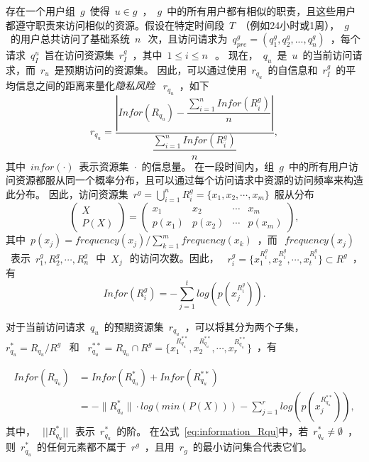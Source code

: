 存在一个用户组~$g$~使得~$u \in g$~，~$g$~中的所有用户都有相似的职责，且这些用户都遵守职责来访问相似的资源。假设在特定时间段~$T$~（例如24小时或1周），~$g$~的用户总共访问了基础系统~$n~$~次，且访问请求为~$q^g_{pre}=(q^g_1,q^g_2,...,q^g_n)$~，每个请求~$q^u_I$~旨在访问资源集~$r^g_I$~，其中~$1 \leq i \leq n~$~。
现在，~$q_u$~是~$u$~的当前访问请求，而~$r_u$~是预期访问的资源集。 因此，可以通过使用~$r_{q_u}$~的自信息和~$r^g_I$~的平均信息之间的距离来量化\emph{隐私风险} ~$r_{q_u}$~，如下
\begin{equation}\label{eq:privacy_risk_qu}
r_{q_u} = \dfrac{|Infor(R_{q_u})-\dfrac{\sum ^{n}_{i=1} Infor(R^g_i)}{n}|}{\dfrac{\sum ^{n}_{i=1} Infor(R^g_i)}{n}}, 
\end{equation}
其中~$infor(\cdot)$~表示资源集~$\cdot$~的信息量。 在一段时间内，组~$g$~中的所有用户访问资源都服从同一个概率分布，且可以通过每个访问请求中资源的访问频率来构造此分布。 因此，访问资源集~$r^g = \bigcup _{i=1}^n R^g_i=\{x_1, x_2, \cdots, x_m\}$~服从分布
\begin{equation}\label{eq:distribution_Rg}
\left(
\begin{array}{c}
X \\ P(X)
\end{array}
\right)
=\left(
\begin{array}{cccccccccc}
x_1 &  x_2 & \cdots & x_m
\\ p(x_1) &  p(x_2) & \cdots & p(x_m)
\end{array}
\right),
\end{equation}
其中~$p(x_j)=frequency(x_j)/\sum_{k=1}^m frequency(x_k)$~，而~$~frequency(x_j)$~表示~$r^g_1, R^g_2, \cdots, R^g_n~$~中~$X_j~$~的访问次数。因此， ~$r^g_i =\{x_1^{R^g_i},x_2^{R^g_i},\cdots, x_t^{R^g_i}\} \subset R^g$~，有
\begin{equation}\label{eq:information_Rgi}
Infor(R^g_i)=-\sum_{j=1}^t log(p(x_j^{R^g_i})).
\end{equation}

对于当前访问请求~$q_u$~的预期资源集~$r_{q_u}$~，可以将其分为两个子集， ~$r_{q_u}^* = R_{q_u}/R^g$~ 和 ~$r_{q_u}^{**} = R_{q_u} \cap R^g = \{x_1^{R_{q_u}^{**}},x_2^{R_{q_u}^{**}},\cdots, x_r^{R_{q_u}^{**}}\}$~，有

\begin{equation}\label{eq:information_Rqu}
\begin{split}
Infor(R_{q_u})&=Infor(R_{q_u}^{*})  +Infor(R_{q_u}^{**})
\\&=-\|R_{q_u}^*\|\cdot log(min(P(X)))-\sum_{j=1}^r log(p(x_j^{R_{q_u}^{**}})),
\end{split}
\end{equation}
其中，~$~||R_{q_u}^*||~$~表示~$r_{q_u}^*$~的阶。 在公式~\ref{eq:information_Rqu}中，若~$r_{q_u}^* \neq \emptyset$~，则~$r_{q_u}^*$~的任何元素都不属于~$r^g$~，且用~$r_g$~的最小访问集合代表它们。

